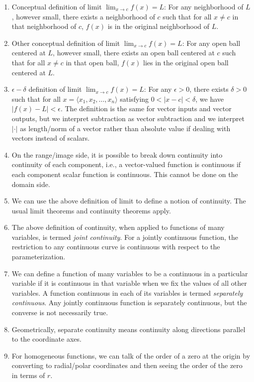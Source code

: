 \documentclass[10pt]{amsart}
\begin{document}
\begin{enumerate}
\item Conceptual definition of limit $\lim_{x \to c} f(x) = L$: For
  any neighborhood of $L$, however small, there exists a neighborhood
  of $c$ such that for all $x \ne c$ in that neighborhood of $c$,
  $f(x)$ is in the original neighborhood of $L$.
\item Other conceptual definition of limit $\lim_{x \to c} f(x) = L$:
  For any open ball centered at $L$, however small, there exists an
  open ball centered at $c$ such that for all $x \ne c$ in that open
  ball, $f(x)$ lies in the original open ball centered at $L$.
\item $\epsilon-\delta$ definition of limit $\lim_{x \to c} f(x) = L$:
  For any $\epsilon > 0$, there exists $\delta > 0$ such that for all
  $x = \langle x_1,x_2,\dots,x_n \rangle$ satisfying $0 < |x - c| <
  \delta$, we have $|f(x) - L| < \epsilon$. The definition is the same
  for vector inputs and vector outputs, but we interpret subtraction
  as vector subtraction and we interpret $| \cdot |$ as length/norm of
  a vector rather than absolute value if dealing with vectors instead
  of scalars.
\item On the range/image side, it is possible to break down continuity
  into continuity of each component, i.e., a vector-valued function is
  continuous if each component scalar function is continuous. This
  cannot be done on the domain side.
\item We can use the above definition of limit to define a notion of
  continuity. The usual limit theorems and continuity theorems apply.
\item The above definition of continuity, when applied to functions of
  many variables, is termed {\em joint continuity}. For a jointly
  continuous function, the restriction to any continuous curve is
  continuous with respect to the parameterization.
\item We can define a function of many variables to be a continuous in
  a particular variable if it is continuous in that variable when we
  fix the values of all other variables. A function continuous in each
  of its variables is termed {\em separately continuous}. Any jointly
  continuous function is separately continuous, but the converse is
  not necessarily true.
\item Geometrically, separate continuity means continuity along
  directions parallel to the coordinate axes.
\item For homogeneous functions, we can talk of the order of a zero at
  the origin by converting to radial/polar coordinates and then seeing
  the order of the zero in terms of $r$.
\end{enumerate}
\end{document}
